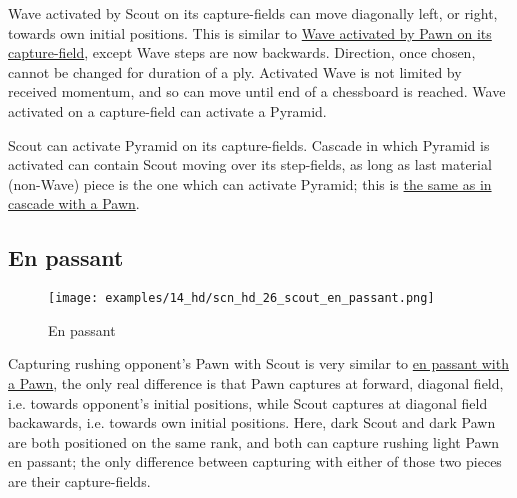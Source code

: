\vspace*{-0.5\baselineskip}
Wave activated by Scout on its capture-fields can move diagonally left, or right,
towards own initial positions. This is similar to
\hyperref[fig:scn_mv_18_wave_activation_by_capture_pawn]{Wave activated by Pawn on its capture-field},
except Wave steps are now backwards. Direction, once chosen, cannot be changed for
duration of a ply. Activated Wave is not limited by received momentum, and so can
move until end of a chessboard is reached. Wave activated on a capture-field can
activate a Pyramid.

Scout can activate Pyramid on its capture-fields. Cascade in which Pyramid is
activated can contain Scout moving over its step-fields, as long as last material
(non-Wave) piece is the one which can activate Pyramid; this is
\hyperref[fig:scn_n_18_sideways_pawns_cascade_pyramids]{the same as in cascade with a Pawn}.

\clearpage %

\subsection*{En passant}
\label{sec:Hemera's Dawn/Scout/En passant}

\vspace*{-0.7\baselineskip}
\noindent
\begin{wrapfigure}[16]{l}{0.4\textwidth}
\centering
\texttt{[image: examples/14\_hd/scn\_hd\_26\_scout\_en\_passant.png]}
\vspace*{-0.3\baselineskip}
\caption{En passant}
\label{fig:scn_hd_26_scout_en_passant}
\end{wrapfigure}
\indent
Capturing rushing opponent's Pawn with Scout is very similar to
\href{https://en.wikipedia.org/wiki/En_passant}{en passant with a Pawn},
the only real difference is that Pawn captures at forward, diagonal field,
i.e. towards opponent's initial positions, while Scout captures at diagonal
field backawards, i.e. towards own initial positions. \newline
\indent
Here, dark Scout and dark Pawn are both positioned on the same rank, and both
can capture rushing light Pawn en passant; the only difference between capturing
with either of those two pieces are their capture-fields.

\clearpage %


